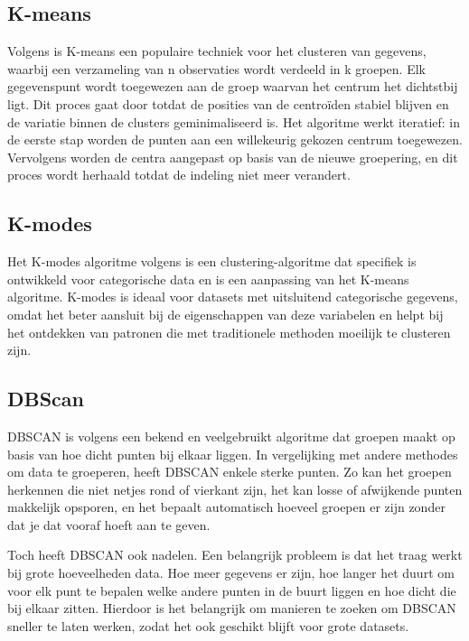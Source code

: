 \subsection*{K-means}

Volgens \textcite{Hu2023} is K-means een populaire techniek voor het clusteren van gegevens, waarbij een verzameling van n observaties wordt verdeeld in k groepen. Elk gegevenspunt wordt toegewezen aan de groep waarvan het centrum het dichtstbij ligt. Dit proces gaat door totdat de posities van de centroïden stabiel blijven en de variatie binnen de clusters geminimaliseerd is. Het algoritme werkt iteratief: in de eerste stap worden de punten aan een willekeurig gekozen centrum toegewezen. Vervolgens worden de centra aangepast op basis van de nieuwe groepering, en dit proces wordt herhaald totdat de indeling niet meer verandert.

\subsection*{K-modes}

Het K-modes algoritme volgens \textcite{Kuo2021} is een clustering-algoritme dat specifiek is ontwikkeld voor categorische data en is een aanpassing van het K-means algoritme. K-modes is ideaal voor datasets met uitsluitend categorische gegevens, omdat het beter aansluit bij de eigenschappen van deze variabelen en helpt bij het ontdekken van patronen die met traditionele methoden moeilijk te clusteren zijn.

\subsection*{DBScan}

DBSCAN is volgens \textcite{Hanafi2022} een bekend en veelgebruikt algoritme dat groepen maakt op basis van hoe dicht punten bij elkaar liggen. In vergelijking met andere methodes om data te groeperen, heeft DBSCAN enkele sterke punten. Zo kan het groepen herkennen die niet netjes rond of vierkant zijn, het kan losse of afwijkende punten makkelijk opsporen, en het bepaalt automatisch hoeveel groepen er zijn zonder dat je dat vooraf hoeft aan te geven.

\vspace{1em}

Toch heeft DBSCAN ook nadelen. Een belangrijk probleem is dat het traag werkt bij grote hoeveelheden data. Hoe meer gegevens er zijn, hoe langer het duurt om voor elk punt te bepalen welke andere punten in de buurt liggen en hoe dicht die bij elkaar zitten. Hierdoor is het belangrijk om manieren te zoeken om DBSCAN sneller te laten werken, zodat het ook geschikt blijft voor grote datasets.

